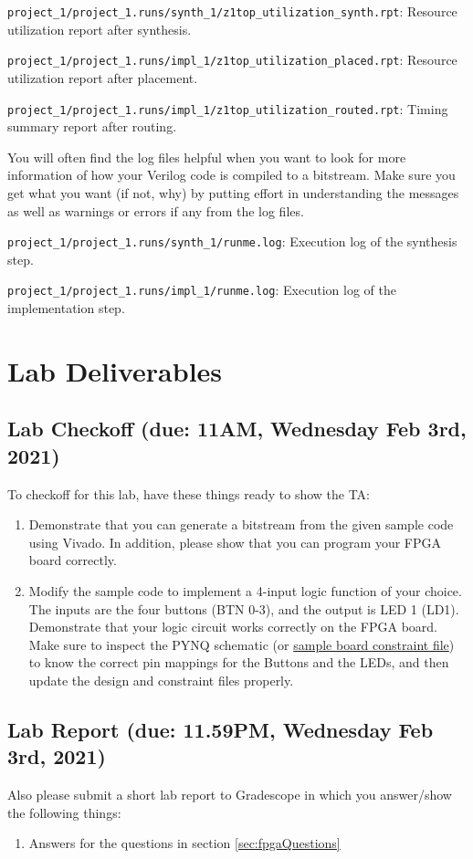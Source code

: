 \documentclass[11pt]{article}
\begin{document}
\verb|project_1/project_1.runs/synth_1/z1top_utilization_synth.rpt|: Resource utilization report after synthesis.

\verb|project_1/project_1.runs/impl_1/z1top_utilization_placed.rpt|: Resource utilization report after placement.

\verb|project_1/project_1.runs/impl_1/z1top_utilization_routed.rpt|: Timing summary report after routing.

You will often find the log files helpful when you want to look for more information of how your Verilog code is compiled to a bitstream. Make sure you get what you want (if not, why) by putting effort in understanding the messages as well as warnings or errors if any from the log files.

\verb|project_1/project_1.runs/synth_1/runme.log|: Execution log of the synthesis step.

\verb|project_1/project_1.runs/impl_1/runme.log|:  Execution log of the implementation step.

\section{Lab Deliverables}
\subsection{Lab Checkoff (due: 11AM, Wednesday Feb 3rd, 2021)}
To checkoff for this lab, have these things ready to show the TA:
\begin{enumerate}
  \item Demonstrate that you can generate a bitstream from the given sample code using Vivado. In addition, please show that you can program your FPGA board correctly.
  \item Modify the sample code to implement a 4-input logic function of your choice. The inputs are the four buttons (BTN 0-3), and the output is LED 1 (LD1). Demonstrate that your logic circuit works correctly on the FPGA board. Make sure to inspect the PYNQ schematic (or \href{https://reference.digilentinc.com/_media/reference/programmable-logic/pynq-z1/pynq-z1_c.zip}{sample board constraint file}) to know the correct pin mappings for the Buttons and the LEDs, and then update the design and constraint files properly.
\end{enumerate}

\subsection{Lab Report (due: 11.59PM, Wednesday Feb 3rd, 2021)}\label{sec:labreport}
Also please submit a short lab report to Gradescope in which you answer/show the following things:
\begin{enumerate}
  \item Answers for the questions in section \ref{sec:fpgaQuestions}
\end{enumerate}
\end{document}
